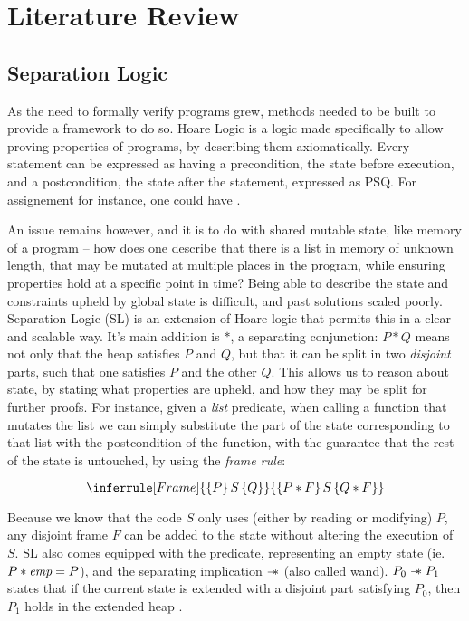 \chapter{Literature Review}

\section{Separation Logic}

As the need to formally verify programs grew, methods needed to be built to provide a framework to do so. Hoare Logic \cite{hoarelogic} is a logic made specifically to allow proving properties of programs, by describing them axiomatically. Every statement can be expressed as having a precondition, the state before execution, and a postcondition, the state after the statement, expressed as \SLtriple PSQ. For assignement for instance, one could have .

An issue remains however, and it is to do with shared mutable state, like memory of a program -- how does one describe that there is a list in memory of unknown length, that may be mutated at multiple places in the program, while ensuring properties hold at a specific point in time? Being able to describe the state and constraints upheld by global state is difficult, and past solutions scaled poorly. Separation Logic (SL) \cite{seplogic1, seplogic2} is an extension of Hoare logic that permits this in a clear and scalable way. It's main addition is $*$, a separating conjunction: $P * Q$ means not only that the heap satisfies $P$ and $Q$, but that it can be split in two \emph{disjoint} parts, such that one satisfies $P$ and the other $Q$. This allows us to reason about state, by stating what properties are upheld, and how they may be split for further proofs. For instance, given a \emph{list} predicate, when calling a function that mutates the list we can simply substitute the part of the state corresponding to that list with the postcondition of the function, with the guarantee that the rest of the state is untouched, by using the \emph{frame rule}:

\[
\inferrule[Frame]
	{\SLtriple{P}{S}{Q}}
	{\SLtriple{P*F}{S}{Q*F}}
\]

Because we know that the code $S$ only uses (either by reading or modifying) $P$, any disjoint frame $F$ can be added to the state without altering the execution of $S$. SL also comes equipped with the \emp predicate, representing an empty state (ie. $P * \textit{emp} = P$), and the separating implication $\mathrel{-\!\!\ast}$ (also called wand). $P_0 \mathrel{-\!\!\ast} P_1$ states that if the current state is extended with a disjoint part satisfying $P_0$, then $P_1$ holds in the extended heap \cite{seplogic2}.

